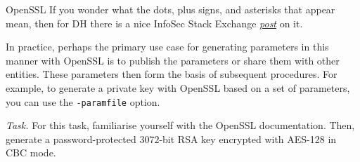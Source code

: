 \documentclass{practice}
\begin{document}
\begin{task}{OpenSSL}
  If you wonder what the dots, plus signs, and asterisks that appear mean, then for DH there is a nice InfoSec Stack Exchange \href{https://security.stackexchange.com/a/140639}{\textit{post}} on it.

  In practice, perhaps the primary use case for generating parameters in this manner with OpenSSL is to publish the parameters or share them with other entities.
  These parameters then form the basis of subsequent procedures.
  For example, to generate a private key with OpenSSL based on a set of parameters, you can use the \texttt{-paramfile} option.

  \textit{Task.}
  For this task, familiarise yourself with the OpenSSL documentation.
  Then, generate a password-protected $3072$-bit RSA key encrypted with AES-128 in CBC mode.
\end{task}
\end{document}
